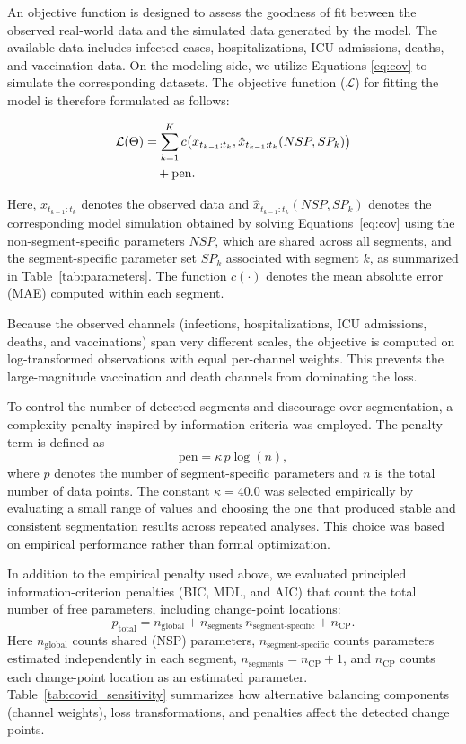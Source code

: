 \documentclass[10pt,letterpaper]{article}
\begin{document}
An objective function is designed to assess the goodness of fit between the observed real-world data and the simulated data generated by the model. The available data includes infected cases, hospitalizations, ICU admissions, deaths, and vaccination data. On the modeling side, we utilize Equations \ref{eq:cov} to simulate the corresponding datasets. The objective function ($\mathcal{L}$) for fitting the model is therefore formulated as follows:

\begin{align}
\mathcal{L}(\Theta)
&=
\sum_{k=1}^{K}
c\!\left(
x_{t_{k-1}:t_k},
\hat{x}_{t_{k-1}:t_k}(NSP, SP_k)
\right)
\notag \\
&\quad
+ \mathrm{pen}.
\end{align}


Here, \(x_{t_{k-1}:t_k}\) denotes the observed data and
\(\hat{x}_{t_{k-1}:t_k}(NSP, SP_k)\) denotes the corresponding model
simulation obtained by solving Equations~\ref{eq:cov} using the
non-segment-specific parameters \(NSP\), which are shared across all
segments, and the segment-specific parameter set \(SP_k\) associated
with segment \(k\), as summarized in Table~\ref{tab:parameters}. The
function \(c(\cdot)\) denotes the mean absolute error (MAE) computed
within each segment.

Because the observed channels (infections, hospitalizations, ICU admissions, deaths, and vaccinations) span very different scales, the objective is computed on log-transformed observations with equal per-channel weights. This prevents the large-magnitude vaccination and death channels from dominating the loss.

To control the number of detected segments and discourage
over-segmentation, a complexity penalty inspired by information criteria
was employed. The penalty term is defined as
\[
\mathrm{pen}
=
\kappa \, p \log(n),
\]
where \(p\) denotes the number of segment-specific parameters and \(n\)
is the total number of data points. The constant $\kappa = 40.0$ was selected empirically by evaluating a
small range of values and choosing the one that produced stable and
consistent segmentation results across repeated analyses. This choice
was based on empirical performance rather than formal optimization.

In addition to the empirical penalty used above, we evaluated principled information-criterion penalties (BIC, MDL, and AIC) that count the total number of free parameters, including change-point locations:
\[
p_{\text{total}} = n_{\text{global}} + n_{\text{segments}} \, n_{\text{segment-specific}} + n_{\text{CP}}.
\]
Here \(n_{\text{global}}\) counts shared (NSP) parameters, \(n_{\text{segment-specific}}\) counts parameters estimated independently in each segment, \(n_{\text{segments}} = n_{\text{CP}} + 1\), and \(n_{\text{CP}}\) counts each change-point location as an estimated parameter. Table~\ref{tab:covid_sensitivity} summarizes how alternative balancing components (channel weights), loss transformations, and penalties affect the detected change points.
\end{document}
